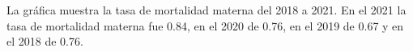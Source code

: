 La gráfica muestra la tasa de mortalidad materna del 2018 a 2021. En el 2021 la tasa de mortalidad materna fue 0.84, en el 2020 de 0.76, en el 2019 de 0.67 y en el 2018 de 0.76. 
